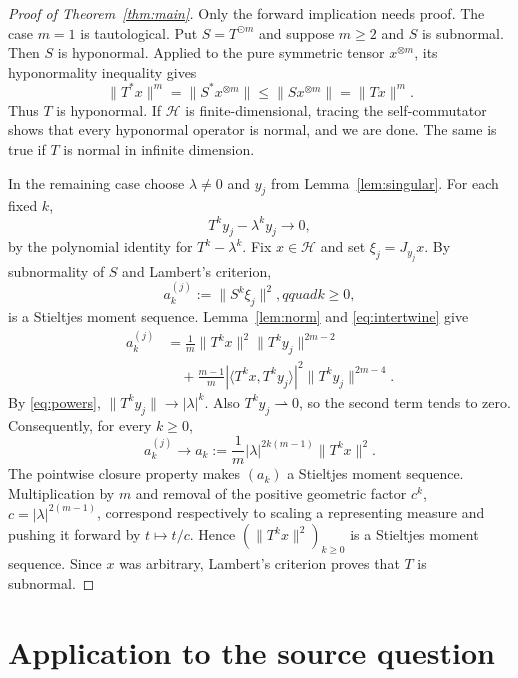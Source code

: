 \documentclass[11pt]{article}
\newcommand{\Hh}{\mathcal H}
\newcommand{\od}{\mathbin{\odot}}
\begin{document}
\begin{proof}[Proof of Theorem~\ref{thm:main}]
Only the forward implication needs proof.  The case $m=1$ is tautological.
Put $S=T^{\od m}$ and suppose $m\ge2$ and $S$ is subnormal.  Then $S$ is
hyponormal.  Applied to the pure symmetric tensor $x^{\otimes m}$, its
hyponormality inequality gives
\[
 \lVert T^*x\rVert^m
 =\lVert S^*x^{\otimes m}\rVert
 \le\lVert Sx^{\otimes m}\rVert
 =\lVert Tx\rVert^m.
\]
Thus $T$ is hyponormal.  If $\Hh$ is finite-dimensional, tracing the
self-commutator shows that every hyponormal operator is normal, and we are
done.  The same is true if $T$ is normal in infinite dimension.

In the remaining case choose $\lambda\ne0$ and $y_j$ from
Lemma~\ref{lem:singular}.  For each fixed $k$,
\begin{equation}\label{eq:powers}
 T^ky_j-\lambda^ky_j\longrightarrow0,
\end{equation}
by the polynomial identity for $T^k-\lambda^k$.  Fix $x\in\Hh$ and set
$\xi_j=J_{y_j}x$.  By subnormality of $S$ and Lambert's criterion,
\[
       a^{(j)}_k:=\lVert S^k\xi_j\rVert^2,qquad k\ge0,
\]
is a Stieltjes moment sequence.  Lemma~\ref{lem:norm} and
\eqref{eq:intertwine} give
\begin{align*}
 a^{(j)}_k
 &=\frac1m\lVert T^kx\rVert^2\lVert T^ky_j\rVert^{2m-2}\\
 &\quad+\frac{m-1}{m}|\langle T^kx,T^ky_j\rangle|^2
                    \lVert T^ky_j\rVert^{2m-4}.
\end{align*}
By \eqref{eq:powers}, $\lVert T^ky_j\rVert\to|\lambda|^k$.  Also
$T^ky_j\rightharpoonup0$, so the second term tends to zero.  Consequently,
for every $k\ge0$,
\begin{equation}\label{eq:limit}
 a^{(j)}_k\longrightarrow
 a_k:=\frac1m|\lambda|^{2k(m-1)}\lVert T^kx\rVert^2.
\end{equation}
The pointwise closure property makes $(a_k)$ a Stieltjes moment sequence.
Multiplication by $m$ and removal of the positive geometric factor
$c^k$, $c=|\lambda|^{2(m-1)}$, correspond respectively to scaling a
representing measure and pushing it forward by $t\mapsto t/c$.  Hence
$(\lVert T^kx\rVert^2)_{k\ge0}$ is a Stieltjes moment sequence.  Since $x$
was arbitrary, Lambert's criterion proves that $T$ is subnormal.
\end{proof}

\section{Application to the source question}
\end{document}
